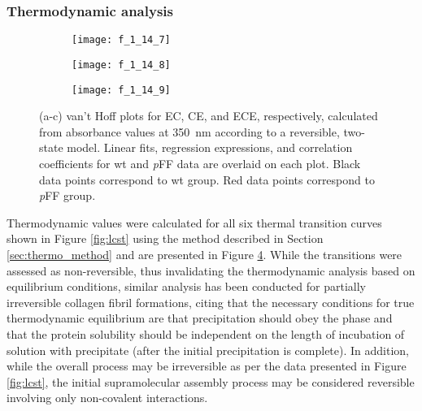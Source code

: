\begin{refsection}
\subsubsection{Thermodynamic analysis}
\label{sec:thermo_analysis}
\begin{figure}[h!]
    \centering
    \begin{subfigure}[b]{0.32\textwidth}
        \texttt{[image: f\_1\_14\_7]}
        \caption{}
        \label{fig:thermo_ECpFF}
    \end{subfigure}
    \begin{subfigure}[b]{0.32\textwidth}
        \texttt{[image: f\_1\_14\_8]}
        \caption{}
        \label{fig:thermo_CEpFF}
    \end{subfigure}
    \begin{subfigure}[b]{0.32\textwidth}
        \texttt{[image: f\_1\_14\_9]}
        \caption{}
        \label{fig:thermo_ECEpFF}
    \end{subfigure}

    \caption{(a-c) van't Hoff plots for EC, CE, and ECE, respectively,
        calculated from absorbance values at \SI{350}{\nm} according to a
        reversible, two-state model. Linear fits, regression expressions, and
        correlation coefficients for wt and \emph{p}FF data are overlaid on each
        plot. Black data points correspond to wt group. Red data points
        correspond to \emph{p}FF group.}
    \label{fig:thermo}
\end{figure}
Thermodynamic values were calculated for all six thermal transition curves shown
in Figure \ref{fig:lcst} using the method described in Section
\ref{sec:thermo_method} and are presented in Figure \ref{fig:thermo}. While the
transitions were assessed as non-reversible, thus invalidating the thermodynamic
analysis based on equilibrium conditions, similar analysis has been conducted
for partially irreversible collagen fibril formations,\cite{Cooper1970} citing
that the necessary conditions for true thermodynamic equilibrium are that
precipitation should obey the phase and that the protein solubility should be
independent on the length of incubation of solution with precipitate (after the
initial precipitation is complete). In addition, while the overall process may
be irreversible as per the data presented in Figure \ref{fig:lcst}, the initial
supramolecular assembly process may be considered reversible involving only
non-covalent interactions.


\end{refsection}
